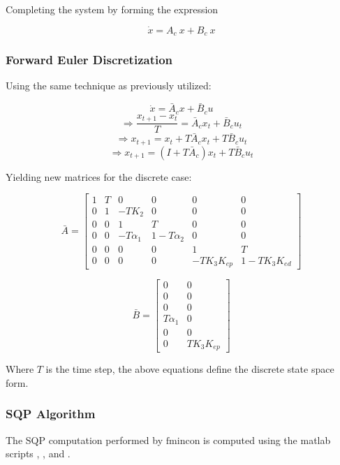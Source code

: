 Completing the system by forming the expression

\begin{equation}
\dot{x} = A_c\ x + B_c\ x
\end{equation}

\subsubsection{Forward Euler Discretization}

Using the same technique as previously utilized:

$$ \dot{x} = \bar{A}_c x + \bar{B}_c u $$
$$ \Rightarrow \frac{x_{t+1} - x_t}{T} = \bar{A}_c x_t + \bar{B}_c u_t $$
$$ \Rightarrow x_{t+1} = x_t + T\bar{A}_c x_t + T\bar{B}_c u_t $$
$$ \Rightarrow x_{t+1} = (I + T\bar{A}_c) x_t + T\bar{B}_c u_t $$

Yielding new matrices for the discrete case:

\begin{equation}
\bar{A} =
\begin{bmatrix}
    1 & T & 0 & 0 & 0 & 0 \\
    0 & 1 & -TK_2 & 0 & 0 & 0 \\
    0 & 0 & 1 & T & 0 & 0 \\
    0 & 0 & -T\alpha_1 & 1-T\alpha_2 & 0 & 0 \\
    0 & 0 & 0 & 0 & 1 & T \\
    0 & 0 & 0 & 0 & -TK_3K_{ep} & 1-TK_3K_{ed}
\end{bmatrix}
\end{equation}

\begin{equation}
\bar{B} =
\begin{bmatrix}
    0 & 0 \\
    0 & 0 \\
    0 & 0 \\
    T\alpha_1 & 0 \\
    0 & 0 \\
    0 & TK_3K_{ep}
\end{bmatrix}
\end{equation}

Where $T$ is the time step, the above equations define the discrete state space form.

\subsubsection{SQP Algorithm}
The SQP computation performed by $\mathrm{fmincon}$ is computed using the matlab scripts , , and .

